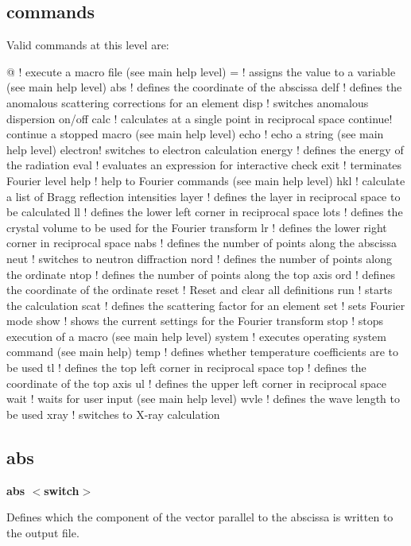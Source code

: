 \subsection*{commands}
Valid commands at this level are: 
\par
\begin{MacVerbatim}
@       ! execute a macro file (see main help level)
=       ! assigns the value to a variable (see main help level)
abs     ! defines the coordinate of the abscissa
delf    ! defines the anomalous scattering corrections for an element
disp    ! switches anomalous dispersion on/off
calc    ! calculates at a single point in reciprocal space
continue! continue a stopped macro (see main help level)
echo    ! echo a string (see main help level)
electron! switches to electron calculation
energy  ! defines the energy of the radiation
eval    ! evaluates an expression for interactive check
exit    ! terminates Fourier level
help    ! help to Fourier commands (see main help level)
hkl     ! calculate a list of Bragg reflection intensities
layer   ! defines the layer in reciprocal space to be calculated
ll      ! defines the lower left corner in reciprocal space
lots    ! defines the crystal volume to be used for the Fourier transform
lr      ! defines the lower right corner in reciprocal space
nabs    ! defines the number of points along the abscissa
neut    ! switches to neutron diffraction
nord    ! defines the number of points along the ordinate
ntop    ! defines the number of points along the top axis
ord     ! defines the coordinate of the ordinate
reset   ! Reset and clear all definitions
run     ! starts the calculation
scat    ! defines the scattering factor for an element
set     ! sets Fourier mode
show    ! shows the current settings for the Fourier transform
stop    ! stops execution of a macro (see main help level)
system  ! executes operating system command (see main help)
temp    ! defines whether temperature coefficients are to be used
tl      ! defines the top   left corner in reciprocal space
top     ! defines the coordinate of the top axis
ul      ! defines the upper left corner in reciprocal space
wait    ! waits for user input (see main help level)
wvle    ! defines the wave length to be used
xray    ! switches to X-ray calculation
\end{MacVerbatim}
\subsection*{abs}
{\bf abs $ <$switch$> $ \par }
\par
\vspace{3pt}
Defines which the component of the vector parallel to the abscissa 
is written to the output file. 

